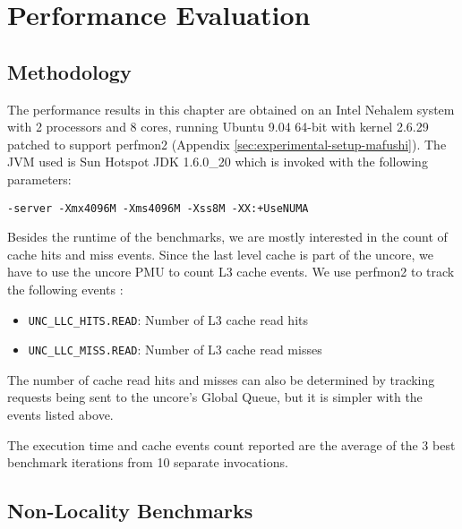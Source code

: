 
\chapter{Performance Evaluation}
\label{chap:locality-performance}

\section{Methodology}
\label{sec:locality-performance-methodology}

The performance results in this chapter are obtained on an Intel
Nehalem system with 2 processors and 8 cores, running Ubuntu 9.04
64-bit with kernel 2.6.29 patched to support perfmon2
\cite{Eranian2008} (Appendix
\ref{sec:experimental-setup-mafushi}). The JVM used is Sun Hotspot JDK
1.6.0\_20 which is invoked with the following parameters:

\begin{lstlisting}[style=Listing]
  -server -Xmx4096M -Xms4096M -Xss8M -XX:+UseNUMA
\end{lstlisting}

Besides the runtime of the benchmarks, we are mostly interested in the
count of cache hits and miss events. Since the last level cache is
part of the uncore, we have to use the uncore PMU to count L3 cache
events. We use perfmon2 to track the following events
\cite{Levinthal2009}:

\begin{itemize}
\item \lstinline!UNC_LLC_HITS.READ!: Number of L3 cache read hits
\item \lstinline!UNC_LLC_MISS.READ!: Number of L3 cache read misses
\end{itemize}

The number of cache read hits and misses can also be determined by
tracking requests being sent to the uncore's Global Queue, but it is
simpler with the events listed above.

The execution time and cache events count reported are the average of
the 3 best benchmark iterations from 10 separate invocations.


\section{Non-Locality Benchmarks}
\label{sec:locality-performance-non-locality}

